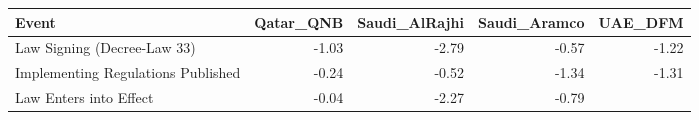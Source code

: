 \begin{tabular}{lrrrr}
  \toprule
Event & Qatar\_QNB & Saudi\_AlRajhi & Saudi\_Aramco & UAE\_DFM \\
  \midrule
Law Signing (Decree-Law 33) & -1.03 & -2.79 & -0.57 & -1.22 \\
  Implementing Regulations Published & -0.24 & -0.52 & -1.34 & -1.31 \\
  Law Enters into Effect & -0.04 & -2.27 & -0.79 &  \\
   \bottomrule
\end{tabular}
